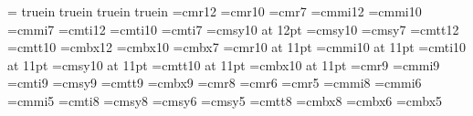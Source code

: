 %
\magnification=
 truein
 truein
 truein
 truein
\raggedbottom
\parindent=0pt
\parskip=0pt
\font\twelverm=cmr12           \font\tenrm=cmr10   \font\sevenrm=cmr7
\font\twelvei=cmmi12           \font\teni=cmmi10   \font\seveni=cmmi7
\font\twelveit=cmti12          \font\tenit=cmti10  \font\sevenit=cmti7
\font\twelvesy=cmsy10 at 12pt  \font\tensy=cmsy10  \font\sevensy=cmsy7
\font\twelvett=cmtt12          \font\tentt=cmtt10  
\font\twelvebf=cmbx12          \font\tenbf=cmbx10  \font\sevenbf=cmbx7
%
\font\elevenrm=cmr10 at 11pt
\font\eleveni=cmmi10 at 11pt
\font\elevenit=cmti10 at 11pt
\font\elevensy=cmsy10 at 11pt
\font\eleventt=cmtt10 at 11pt
\font\elevenbf=cmbx10 at 11pt
%
\font\ninerm=cmr9
\font\ninei=cmmi9
\font\nineit=cmti9
\font\ninesy=cmsy9
\font\ninett=cmtt9
\font\ninebf=cmbx9
%
\font\eightrm=cmr8    \font\sixrm=cmr6    \font\fiverm=cmr5
\font\eighti=cmmi8    \font\sixi=cmmi6    \font\fivei=cmmi5
\font\eightit=cmti8
\font\eightsy=cmsy8   \font\sixsy=cmsy6   \font\fivesy=cmsy5
\font\eighttt=cmtt8
\font\eightbf=cmbx8   \font\sixbf=cmbx6   \font\fivebf=cmbx5
\def\twelvepoint{\def\rm{\fam0\twelverm}
    \textfont0=\twelverm \scriptfont0=\tenrm \scriptscriptfont0=\sevenrm
    \textfont1=\twelvei  \scriptfont1=\teni  \scriptscriptfont1=\seveni
    \textfont2=\twelvesy \scriptfont2=\tensy \scriptscriptfont2=\sevensy
    \textfont\itfam=\twelveit  \def\it{\fam\itfam\twelveit}
    \textfont\ttfam=\twelvett  \def\tt{\fam\ttfam\twelvett}
    \textfont\bffam=\twelvebf  \scriptfont\bffam=\tenbf
      \scriptscriptfont\bffam=\tenbf   \def\bf{\fam\bffam\twelvebf}
    \normalbaselineskip=16pt
    \setbox\strutbox=\hbox{\vrule height12pt depth4pt width0pt}
    \normalbaselines\rm}
\def\elevenpoint{\def\rm{\fam0\elevenrm}
    \textfont0=\elevenrm \scriptfont0=\eightrm \scriptscriptfont0=\sixrm
    \textfont1=\eleveni  \scriptfont1=\eighti  \scriptscriptfont1=\sixi
    \textfont2=\elevensy \scriptfont2=\eightsy \scriptscriptfont2=\sixsy
    \textfont\itfam=\elevenit  \def\it{\fam\itfam\elevenit}
    \textfont\ttfam=\eleventt  \def\tt{\fam\ttfam\eleventt}
    \textfont\bffam=\elevenbf  \scriptfont\bffam=\eightbf
      \scriptscriptfont\bffam=\sixbf   \def\bf{\fam\bffam\elevenbf}
    \normalbaselineskip=13pt
    \setbox\strutbox=\hbox{\vrule height8.5pt depth3.5pt width0pt}
    \normalbaselines\rm}
